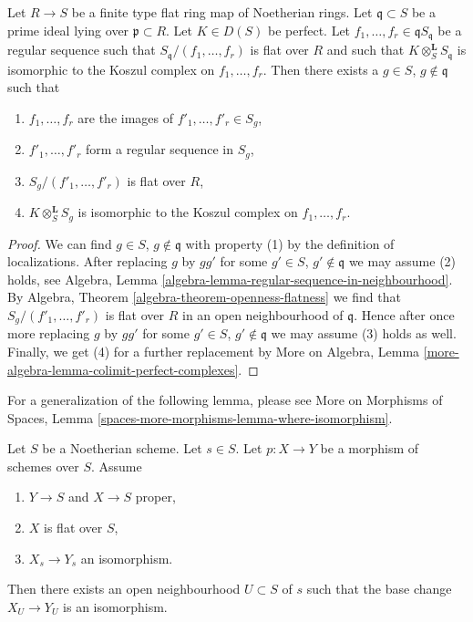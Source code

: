 \begin{lemma}
\label{lemma-limit-arguments}
Let $R \to S$ be a finite type flat ring map of Noetherian rings.
Let $\mathfrak q \subset S$ be a prime ideal lying over
$\mathfrak p \subset R$. Let $K \in D(S)$ be perfect.
Let $f_1, \ldots, f_r \in \mathfrak q S_\mathfrak q$
be a regular sequence such that $S_\mathfrak q/(f_1, \ldots, f_r)$
is flat over $R$ and such that
$K \otimes_S^\mathbf{L} S_\mathfrak q$ is isomorphic to the
Koszul complex on $f_1, \ldots, f_r$. Then there exists a
$g \in S$, $g \not \in \mathfrak q$ such that
\begin{enumerate}
\item $f_1, \ldots, f_r$ are the images of
$f'_1, \ldots, f'_r \in S_g$,
\item $f'_1, \ldots, f'_r$ form a regular sequence in $S_g$,
\item $S_g/(f'_1, \ldots, f'_r)$ is flat over $R$,
\item $K \otimes_S^\mathbf{L} S_g$ is isomorphic to the
Koszul complex on $f_1, \ldots, f_r$.
\end{enumerate}
\end{lemma}

\begin{proof}
We can find $g \in S$, $g \not \in \mathfrak q$ with property (1) by
the definition of localizations. After replacing $g$ by
$gg'$ for some $g' \in S$, $g' \not \in \mathfrak q$
we may assume (2) holds, see
Algebra, Lemma \ref{algebra-lemma-regular-sequence-in-neighbourhood}.
By Algebra, Theorem \ref{algebra-theorem-openness-flatness}
we find that $S_g/(f'_1, \ldots, f'_r)$ is flat over $R$
in an open neighbourhood of $\mathfrak q$.
Hence after once more replacing $g$ by $gg'$ for some
$g' \in S$, $g' \not \in \mathfrak q$ we may assume (3) holds as well.
Finally, we get (4) for a further replacement by
More on Algebra, Lemma \ref{more-algebra-lemma-colimit-perfect-complexes}.
\end{proof}

\noindent
For a generalization of the following lemma, please see
More on Morphisms of Spaces, Lemma
\ref{spaces-more-morphisms-lemma-where-isomorphism}.

\begin{lemma}
\label{lemma-isomorphism-in-neighbourhood}
Let $S$ be a Noetherian scheme. Let $s \in S$.
Let $p : X \to Y$ be a morphism of schemes over $S$.
Assume
\begin{enumerate}
\item $Y \to S$ and $X \to S$ proper,
\item $X$ is flat over $S$,
\item $X_s \to Y_s$ an isomorphism.
\end{enumerate}
Then there exists an open neighbourhood $U \subset S$ of $s$
such that the base change $X_U \to Y_U$ is an isomorphism.
\end{lemma}

